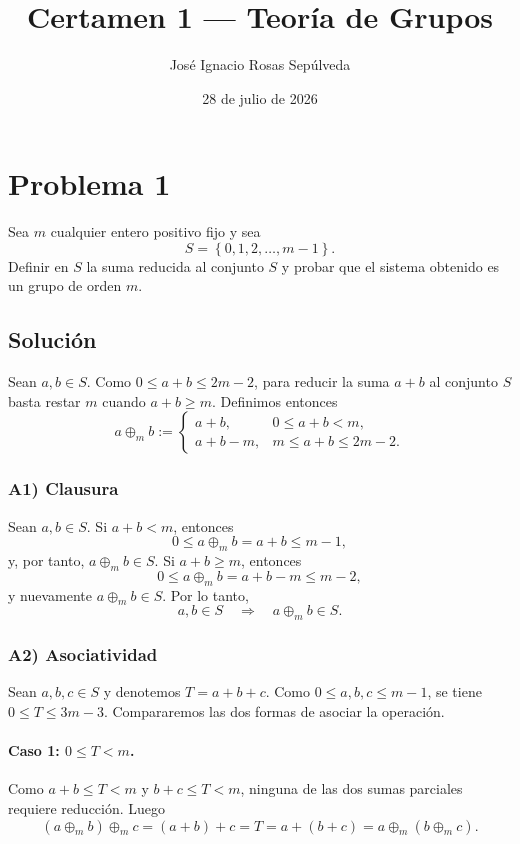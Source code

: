 \documentclass[11pt,a4paper]{article}
\title{Certamen 1 --- Teoría de Grupos}
\author{José Ignacio Rosas Sepúlveda}
\date{28 de julio de 2026}
\newcommand{\set}[1]{\left\{#1\right\}}
\newcommand{\opm}{\mathbin{\oplus_m}}
\begin{document}
\maketitle

\section*{Problema 1}

Sea $m$ cualquier entero positivo fijo y sea
\[
S=\set{0,1,2,\ldots,m-1}.
\]
Definir en $S$ la suma reducida al conjunto $S$ y probar que el sistema obtenido es un grupo de orden $m$.

\subsection*{Solución}

Sean $a,b\in S$. Como $0\leq a+b\leq 2m-2$, para reducir la suma $a+b$ al conjunto $S$ basta restar $m$ cuando $a+b\geq m$. Definimos entonces
\[
a\opm b:=
\begin{cases}
a+b, & 0\leq a+b<m,\\
a+b-m, & m\leq a+b\leq 2m-2.
\end{cases}
\]

\subsubsection*{A1) Clausura}

Sean $a,b\in S$. Si $a+b<m$, entonces
\[
0\leq a\opm b=a+b\leq m-1,
\]
y, por tanto, $a\opm b\in S$. Si $a+b\geq m$, entonces
\[
0\leq a\opm b=a+b-m\leq m-2,
\]
y nuevamente $a\opm b\in S$. Por lo tanto,
\[
a,b\in S\quad\Longrightarrow\quad a\opm b\in S.
\]

\subsubsection*{A2) Asociatividad}

Sean $a,b,c\in S$ y denotemos $T=a+b+c$. Como $0\leq a,b,c\leq m-1$, se tiene $0\leq T\leq 3m-3$. Compararemos las dos formas de asociar la operación.

\paragraph{Caso 1: $0\leq T<m$.}
Como $a+b\leq T<m$ y $b+c\leq T<m$, ninguna de las dos sumas parciales requiere reducción. Luego
\[
(a\opm b)\opm c=(a+b)+c=T=a+(b+c)=a\opm(b\opm c).
\]
\end{document}
